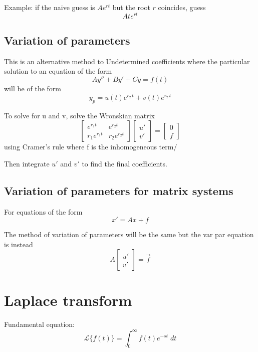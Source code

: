 \documentclass[12pt]{article}
\renewcommand{\L}[1]{\mathcal{L}\{#1\}}
\begin{document}
Example: if the naive guess is $Ae^{rt}$ but the root $r$ coincides, guess
\[Ate^{rt}\]

\subsection*{Variation of parameters}
This is an alternative method to Undetermined coefficients where the particular solution to an equation of the form 
\[Ay'' + By' + Cy = f(t)\]
will be of the form 
\[y_p = u(t) e^{r_2\, t} + v(t) e^{r_2\,t}\]

To solve for u and v, solve the Wronskian matrix 
\[\begin{bmatrix}
    e^{r_1t} & e^{r_2 t}\\
    r_1 e^{r_1 t} & r_2 e^{r_2 t}
\end{bmatrix} \begin{bmatrix}
    u'\\
    v'
\end{bmatrix} = \begin{bmatrix}
    0\\
    f
\end{bmatrix}\]
using Cramer's rule where f is the inhomogeneous term/

Then integrate $u'$ and $v'$ to find the final coefficients.

\subsection*{Variation of parameters for matrix systems}
For equations of the form
\[x' = Ax + f\]

The method of variation of parameters will be the same but the var par equation is instead 
\[A\begin{bmatrix}
    u'\\
    v'
\end{bmatrix}= \vec{f}\]

\section{Laplace transform}
Fundamental equation:
\[\L{f(t)} = \int_0^\infty f(t) e^{-st}\; dt\]
\end{document}
